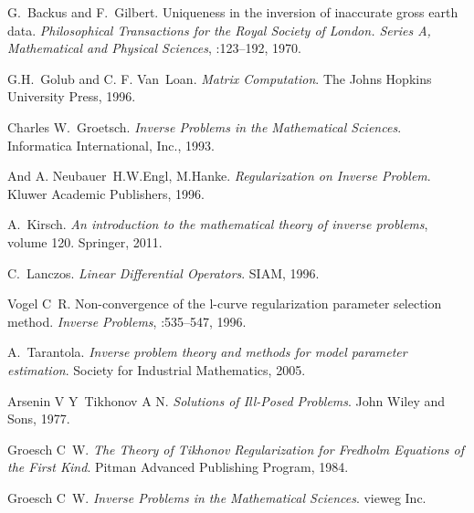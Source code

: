 \documentclass[a4paper]{article}
\newcommand{\tmtextit}[1]{{\itshape{#1}}}
\begin{document}
\begin{thebibliography}{11}
  G.~Backus and F.~Gilbert.{\newblock} Uniqueness in the
  inversion of inaccurate gross earth data.{\newblock} \tmtextit{Philosophical
  Transactions for the Royal Society of London. Series A, Mathematical and
  Physical Sciences}, :123--192, 1970.{\newblock}

  G.H.~Golub and C. F. Van~Loan.{\newblock} \tmtextit{Matrix
  Computation}.{\newblock} The Johns Hopkins University Press,
  1996.{\newblock}

  Charles W.~Groetsch.{\newblock} \tmtextit{Inverse Problems in
  the Mathematical Sciences}.{\newblock} Informatica International, Inc.,
  1993.{\newblock}

  And A. Neubauer~H.W.Engl, M.Hanke.{\newblock}
  \tmtextit{Regularization on Inverse Problem}.{\newblock} Kluwer Academic
  Publishers, 1996.{\newblock}

  A.~Kirsch.{\newblock} \tmtextit{An introduction to the
  mathematical theory of inverse problems}, volume 120.{\newblock} Springer,
  2011.{\newblock}

  C.~Lanczos.{\newblock} \tmtextit{Linear Differential
  Operators}.{\newblock} SIAM, 1996.{\newblock}

  Vogel C~R.{\newblock} Non-convergence of the l-curve
  regularization parameter selection method.{\newblock} \tmtextit{Inverse
  Problems}, :535--547, 1996.{\newblock}

  A.~Tarantola.{\newblock} \tmtextit{Inverse problem theory and
  methods for model parameter estimation}.{\newblock} Society for Industrial
  Mathematics, 2005.{\newblock}

  Arsenin V Y~Tikhonov A N.{\newblock} \tmtextit{Solutions of
  Ill-Posed Problems}.{\newblock} John Wiley and Sons, 1977.{\newblock}

  Groesch C~W.{\newblock} \tmtextit{The Theory of Tikhonov
  Regularization for Fredholm Equations of the First Kind}.{\newblock} Pitman
  Advanced Publishing Program, 1984.{\newblock}

  Groesch C~W.{\newblock} \tmtextit{Inverse Problems in the Mathematical Sciences}.{\newblock} vieweg Inc.{\newblock}

\end{thebibliography}
\end{document}
